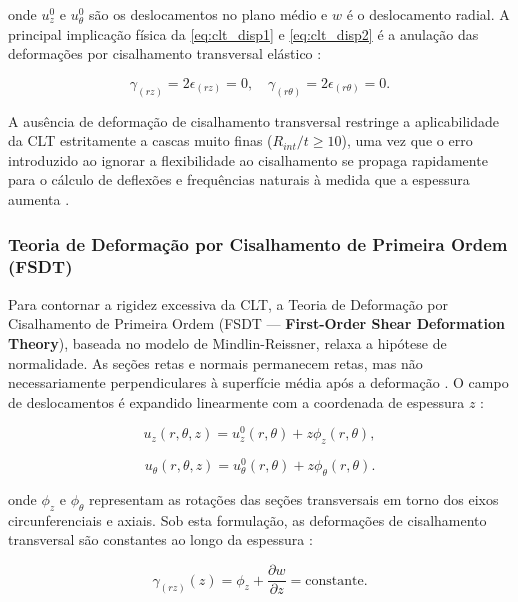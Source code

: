 onde $u_z^0$ e $u_\theta^0$ são os deslocamentos no plano médio e $w$ é o deslocamento radial. A principal implicação física da \eqref{eq:clt_disp1} e \eqref{eq:clt_disp2} é a anulação das deformações por cisalhamento transversal elástico \cite{RMJones2018}:

\begin{equation}
     \gamma_{(rz)} = 2\epsilon_{(rz)} = 0, \quad \gamma_{(r\theta)} = 2\epsilon_{(r\theta)} = 0 .
\end{equation} \label{eq:clt_shear}

A ausência de deformação de cisalhamento transversal restringe a aplicabilidade da CLT estritamente a cascas muito finas ($R_{int}/t \ge  10$), uma vez que o erro introduzido ao ignorar a flexibilidade ao cisalhamento se propaga rapidamente para o cálculo de deflexões e frequências naturais à medida que a espessura aumenta \cite{RMJones2018}.

\subsubsection{Teoria de Deformação por Cisalhamento de Primeira Ordem (FSDT)}

Para contornar a rigidez excessiva da CLT, a Teoria de Deformação por Cisalhamento de Primeira Ordem (FSDT — \textbf{First-Order Shear Deformation Theory}), baseada no modelo de Mindlin-Reissner, relaxa a hipótese de normalidade. As seções retas e normais permanecem retas, mas não necessariamente perpendiculares à superfície média após a deformação \cite{RMJones2018}. O campo de deslocamentos é expandido linearmente com a coordenada de espessura $z$ \cite{RMJones2018}:

\begin{equation}
     u_z(r, \theta, z) = u_z^0(r, \theta) + z \phi_z(r, \theta),
\end{equation} \label{eq:fsdt_disp1}

\begin{equation}
    u_\theta(r, \theta, z) = u_\theta^0(r, \theta) + z \phi_\theta(r, \theta).
\end{equation} \label{eq:fsdt_disp2}

onde $\phi_z$ e $\phi_\theta$ representam as rotações das seções transversais em torno dos eixos circunferenciais e axiais. Sob esta formulação, as deformações de cisalhamento transversal são constantes ao longo da espessura \cite{RMJones2018}:

\begin{equation}
    \gamma_{(rz)}(z) = \phi_z + \frac{\partial w}{\partial z} = \text{constante}.
\end{equation} \label{eq:fsdt_shear}

